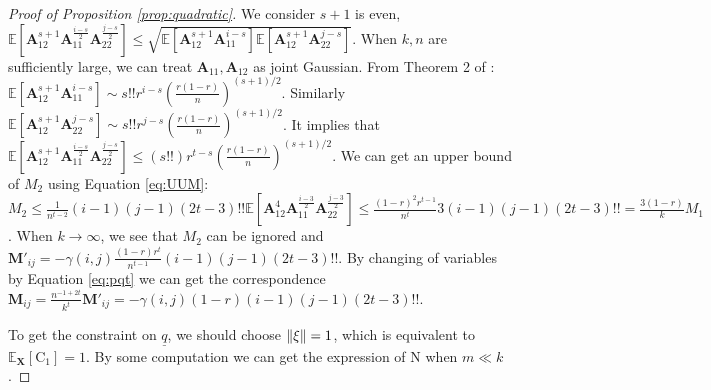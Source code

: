 \documentclass[conference]{IEEEtran}
\DeclarePairedDelimiter\norm{\lVert}{\rVert}
\def\E{\mathbb{E}}
\newcommand{\ide}[2]{ \gamma(#1,#2) }
\begin{document}
\begin{proof}[Proof of Proposition \ref{prop:quadratic}]
We consider $s+1$ is even, $\E[\bm{A}_{12}^{s+1} \bm{A}_{11}^{\frac{i - s}{2}}\bm{A}_{22}^{\frac{j - s}{2}}] \leq \sqrt{\E[\bm{A}_{12}^{s+1}\bm{A}_{11}^{i-s}]\E[\bm{A}_{12}^{s+1}\bm{A}_{22}^{j-s}]}$. When $k, n$ are sufficiently large, we can treat $\bm{A}_{11}, \bm{A}_{12}$ as joint Gaussian. From Theorem 2 of \cite{multivariateBeta}: $\E[\bm{A}_{12}^{s+1}\bm{A}_{11}^{i-s}] \sim s!! r^{i-s}(\frac{r(1-r)}{n})^{(s+1)/2}$. Similarly $\E[\bm{A}_{12}^{s+1}\bm{A}_{22}^{j-s}] \sim s!! r^{j-s}(\frac{r(1-r)}{n})^{(s+1)/2}$. It implies that $\E[\bm{A}_{12}^{s+1} \bm{A}_{11}^{\frac{i - s}{2}}\bm{A}_{22}^{\frac{j - s}{2}}] \leq (s!!) r^{t-s}(\frac{r(1-r)}{n})^{(s+1)/2}$. We can get an upper bound of $M_2$ using Equation \ref{eq:UUM}: $M_2 \leq \frac{1}{n^{t-2}} (i-1)(j-1)(2t-3)!!\E[\bm{A}_{12}^{4} \bm{A}_{11}^{\frac{i - 3}{2}}\bm{A}_{22}^{\frac{j - 3}{2}}] \leq \frac{(1-r)^2 r^{t-1}}{n^t}3(i-1)(j-1)(2t-3)!!= \frac{3(1-r)}{k} M_1$.
When $k \to \infty$, we see that $M_2$ can be ignored and $\mathbf{M}'_{ij} = -\ide{i}{j}\frac{(1-r)r^t}{n^{t-1}}(i-1)(j-1)(2t-3)!!$. By changing of variables by Equation \ref{eq:pqt} we can get the correspondence $\mathbf{M}_{ij} = \frac{n^{-1+2t}}{k^t} \mathbf{M}'_{ij} = -\ide{i}{j}(1-r)(i-1)(j-1)(2t-3)!!$. 

To get the constraint on $\underline{q}$, we should choose $\norm{\xi} = 1$, which is equivalent to $\E_{\bm{X}}[\mathrm{C}_1] = 1$. By some computation we can get the expression of $\mathrm{N}$ when $ m \ll k$.

\end{proof}
\end{document}
